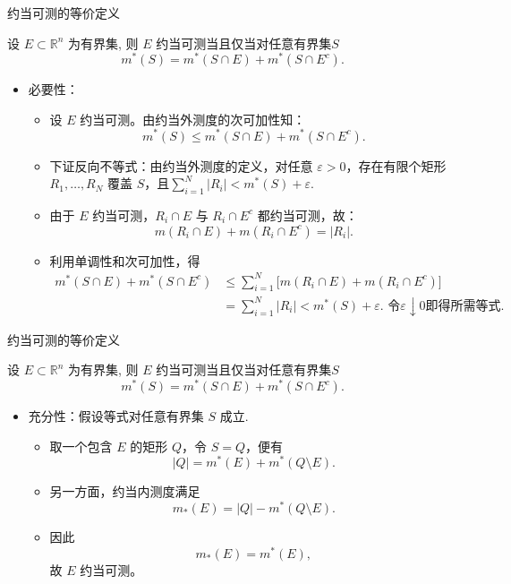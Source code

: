 \documentclass[Prob-All.tex]{subfiles}
\begin{document}
\begin{frame}{约当可测的等价定义}
\begin{thm}
设 $E\subset\mathbb{R}^n$ 为有界集, 则 $E$ 约当可测当且仅当对任意有界集$S$
	\[
	m^*(S)=m^*(S\cap E)+m^*(S\cap E^c).
	\]%
\end{thm} %
\vspace{-0.7cm}
 \begin{itemize}[<+-|alert@+>]
	\item 必要性：
	\begin{itemize}[<+-|alert@+>]
	\item 设 \(E\) 约当可测。由约当外测度的次可加性知：
\[
m^*(S)\le m^*(S\cap E)+m^*(S\cap E^c).
\]
\item 下证反向不等式：由约当外测度的定义，对任意 \(\varepsilon>0\)，存在有限个矩形 \(R_1,\dots,R_N\) 覆盖 \(S\)，且$\sum_{i=1}^N |R_i|<m^*(S)+\varepsilon.$
\item 由于 \(E\) 约当可测，\(R_i\cap E\) 与 \(R_i\cap E^c\) 都约当可测，故：
\[
m(R_i\cap E)+m(R_i\cap E^c)=|R_i|.
\]
\item 利用单调性和次可加性，得
\[
\begin{aligned}
m^*(S\cap E)+m^*(S\cap E^c)
&\le \sum_{i=1}^N
\bigl[m(R_i\cap E)+m(R_i\cap E^c)\bigr]\\
&=\sum_{i=1}^N|R_i|
<m^*(S)+\varepsilon. \text{ 令} \varepsilon\downarrow0\text{即得所需等式.}
\end{aligned}
\]

\end{itemize}
\end{itemize}

\end{frame}
\begin{frame}{约当可测的等价定义}
\begin{thm}
设 $E\subset\mathbb{R}^n$ 为有界集, 则 $E$ 约当可测当且仅当对任意有界集$S$
	\[
	m^*(S)=m^*(S\cap E)+m^*(S\cap E^c).
	\]%
\end{thm} %
\vspace{-0.5cm}
\begin{itemize}[<+-|alert@+>]
	\item 充分性：假设等式对任意有界集 \(S\) 成立.
	\begin{itemize}[<+-|alert@+>]
	\item 取一个包含 \(E\) 的矩形 \(Q\)，令 \(S=Q\)，便有
\[
|Q|=m^*(E)+m^*(Q\setminus E).
\]
\item 另一方面，约当内测度满足
\[
m_*(E)=|Q|-m^*(Q\setminus E).
\]
\item 因此
\[
m_*(E)=m^*(E),
\]故 \(E\) 约当可测。
\end{itemize}
\end{itemize}

\end{frame}
\end{document}

